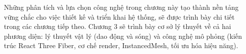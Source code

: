 Những phân tích và lựa chọn công nghệ trong chương này tạo thành nền tảng vững chắc cho việc thiết kế và triển khai hệ thống, sẽ được trình bày chi tiết trong các chương tiếp theo. Chương 3 sẽ trình bày cơ sở lý thuyết về cả hai phương diện: lý thuyết vật lý (dao động và sóng) và công nghệ mô phỏng (kiến trúc React Three Fiber, cơ chế render, InstancedMesh, tối ưu hóa hiệu năng).